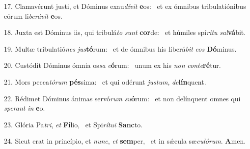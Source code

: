 17. Clamavérunt justi, et Dóminus exau\textit{dí}\textit{vit} \textbf{e}os: \ast\  et ex ómnibus tribulatiónibus eórum li\textit{be}\textit{rá}\textit{vit} \textbf{e}os.\

18. Juxta est Dóminus iis, qui tribulá\textit{to} \textit{sunt} \textbf{cor}de: \ast\  et húmiles spí\textit{ri}\textit{tu} \textit{sal}\textbf{vá}bit.\

19. Multæ tribulatió\textit{nes} \textit{jus}\textbf{tó}rum: \ast\  et de ómnibus his liberá\textit{bit} \textit{e}\textit{os} \textbf{Dó}minus.\

20. Custódit Dóminus ómnia os\textit{sa} \textit{e}\textbf{ó}rum: \ast\  unum ex his \textit{non} \textit{con}\textit{te}\textbf{ré}tur.\

21. Mors pecca\textit{tó}\textit{rum} \textbf{pés}sima: \ast\  et qui odérunt \textit{jus}\textit{tum}, \textit{de}\textbf{lín}quent.\

22. Rédimet Dóminus ánimas servó\textit{rum} \textit{su}\textbf{ó}rum: \ast\  et non delínquent omnes qui \textit{spe}\textit{rant} \textit{in} \textbf{e}o.\

23. Glória Pa\textit{tri}, \textit{et} \textbf{Fí}lio, \ast\  et Spi\textit{rí}\textit{tu}\textit{i} \textbf{Sanc}to.\

24. Sicut erat in princípio, et \textit{nunc}, \textit{et} \textbf{sem}per, \ast\  et in sǽcula sæ\textit{cu}\textit{ló}\textit{rum}. \textbf{A}men.\

